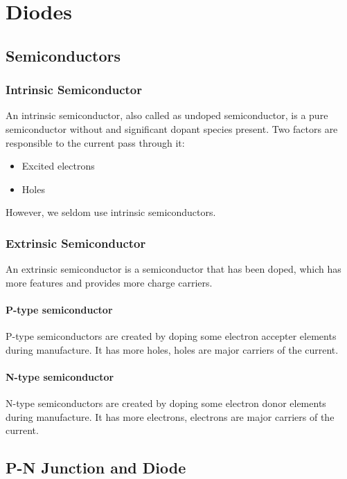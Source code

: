 \chapter{Diodes}

\section{Semiconductors}

\subsection{Intrinsic Semiconductor}

An intrinsic semiconductor, also called as undoped semiconductor, is a pure semiconductor without and significant dopant species present. Two factors are responsible to the current pass through it:

\begin{itemize}
\item Excited electrons
\item Holes
\end{itemize}

However, we seldom use intrinsic semiconductors.

\subsection{Extrinsic Semiconductor}

An extrinsic semiconductor is a semiconductor that has been doped, which has more features and provides more charge carriers.

\subsubsection{P-type semiconductor}

P-type semiconductors are created by doping some electron accepter elements during manufacture. It has more holes, holes are major carriers of the current.

\subsubsection{N-type semiconductor}

N-type semiconductors are created by doping some electron donor elements during manufacture. It has more electrons, electrons are major carriers of the current.

\section{P-N Junction and Diode}

